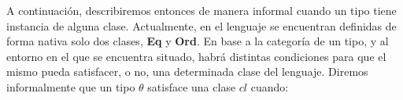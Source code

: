 A continuación, describiremos entonces de manera informal cuando un tipo tiene instancia de alguna clase. Actualmente, en el lenguaje se encuentran definidas de forma nativa solo dos clases, \textbf{Eq} y \textbf{Ord}.%
 En base a la categoría de un tipo, y al entorno en el que se encuentra situado, habrá distintas condiciones para que el mismo pueda satisfacer, o no, una determinada clase del lenguaje.
Diremos informalmente que un tipo $\theta$ satisface una clase $cl$ cuando:
